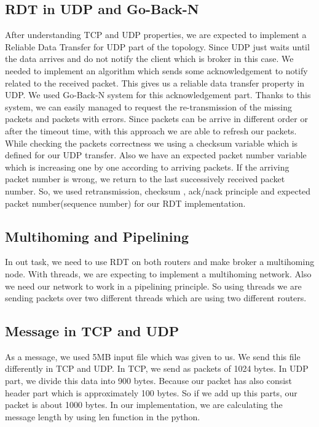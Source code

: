 \documentclass[conference]{IEEEtran}
\begin{document}
\subsection{RDT in UDP and Go-Back-N}
After understanding TCP and UDP properties, we are expected to implement a Reliable Data Transfer for UDP part of the topology. Since UDP just waits until the data arrives and do not notify the client which is broker in this case. We needed to implement an algorithm which sends some acknowledgement to notify related to the received packet. This gives us a reliable data transfer property in UDP. We used Go-Back-N system for this acknowledgement part. Thanks to this system, we can easily managed to request the re-transmission of the missing packets and packets with errors. Since packets can be arrive in different order or after the timeout time, with this approach we are able to refresh our packets. While checking the packets correctness we using a checksum variable which is defined for our UDP transfer. Also we have an expected packet number variable which is increasing one by one according to arriving packets. If the arriving packet number is wrong, we return to the last successively received packet number. So, we used retransmission, checksum , ack/nack principle and expected packet number(sequence number) for our RDT implementation.

\subsection{Multihoming and Pipelining}
In out task, we need to use RDT on both routers and make broker a multihoming node. With threads, we are expecting to implement a multihoming network. Also we need our network to work in a pipelining principle. So using threads we are sending packets over two different threads which are using two different routers.

\subsection{Message in TCP and UDP}

As a message, we used 5MB input file which was given to us. We send this file differently in TCP and UDP. In TCP, we send as packets of 1024 bytes. In UDP part, we divide this data into 900 bytes. Because our packet has also consist header part which is approximately 100 bytes. So if we add up this parts, our packet is about 1000 bytes. In our implementation, we are calculating the message length by using len function in the python.
\end{document}
